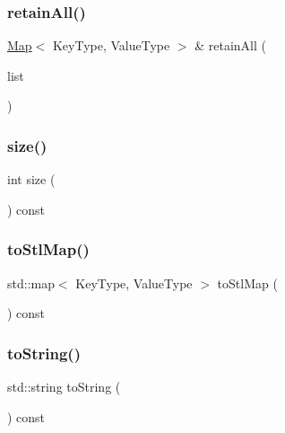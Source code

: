 \mbox{\label{classMap_a16d237e15768c6f5f3b7a9f633a6551d}} 
\subsubsection{\texorpdfstring{retain\+All()}{retainAll()}\hspace{0.1cm}{\footnotesize\ttfamily [2/2]}}
{\footnotesize\ttfamily \mbox{\hyperlink{classMap}{Map}}$<$ Key\+Type, Value\+Type $>$ \& retain\+All (\begin{DoxyParamCaption}\item[{std\+::initializer\+\_\+list$<$ std\+::pair$<$ Key\+Type, Value\+Type $>$ $>$}]{list }\end{DoxyParamCaption})}

\mbox{\label{classMap_af9593d4a5ff4274efaf429cb4f9e57cc}} 
\subsubsection{\texorpdfstring{size()}{size()}}
{\footnotesize\ttfamily int size (\begin{DoxyParamCaption}{ }\end{DoxyParamCaption}) const}

\mbox{\label{classMap_a23355a5d94a45080e9ec0cf50059fb97}} 
\subsubsection{\texorpdfstring{to\+Stl\+Map()}{toStlMap()}}
{\footnotesize\ttfamily std\+::map$<$ Key\+Type, Value\+Type $>$ to\+Stl\+Map (\begin{DoxyParamCaption}{ }\end{DoxyParamCaption}) const}

\mbox{\label{classMap_a1fe5121d6528fdea3f243321b3fa3a49}} 
\subsubsection{\texorpdfstring{to\+String()}{toString()}}
{\footnotesize\ttfamily std\+::string to\+String (\begin{DoxyParamCaption}{ }\end{DoxyParamCaption}) const}

